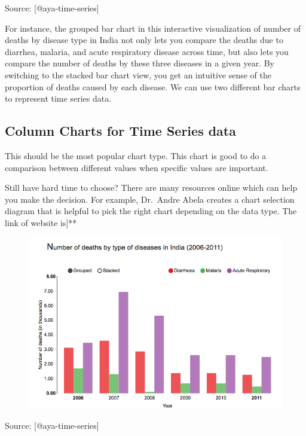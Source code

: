 \documentclass[]{book}
\theoremstyle{definition}
\theoremstyle{definition}
\theoremstyle{definition}
\theoremstyle{remark}
\begin{document}
Source: {[}@aya-time-series{]}

For instance, the grouped bar chart in this interactive visualization of
number of deaths by disease type in India not only lets you compare the
deaths due to diarrhea, malaria, and acute respiratory disease across
time, but also lets you compare the number of deaths by these three
diseases in a given year. By switching to the stacked bar chart view,
you get an intuitive sense of the proportion of deaths caused by each
disease. We can use two different bar charts to represent time series
data.

\subsection{Column Charts for Time Series
data}\label{column-charts-for-time-series-data}

This should be the most popular chart type. This chart is good to do a
comparison between different values when specific values are important.

Still have hard time to choose? There are many resources online which
can help you make the decision. For example, Dr.~Andre Abela creates a
chart selection diagram that is helpful to pick the right chart
depending on the data type. The link of website is{]}**

\begin{figure}
\centering
\includegraphics{images/aya-bar1.png}
\caption{}
\end{figure}

Source: {[}@aya-time-series{]}
\end{document}
